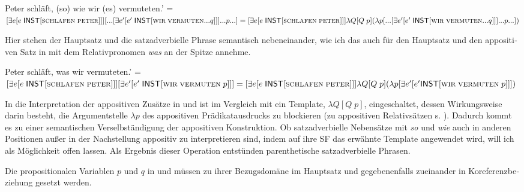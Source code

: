 \documentclass[output=paper, colorlinks, citecolor=brown, booklanguage=german]{langscibook}
\begin{document}
\begin{otherlanguage}{german}
\ea \label{ex:zi97:45} Peter schläft, (so) wie wir (es) vermuteten.' = \\
$[\exists e [e \; \cnst{inst} [\textsc{schlafen} \; \textsc{peter} ]]][...[\exists e' [e' \; \cnst{inst} [\textsc{wir} \; %
\textsc{vermuten} ... q]]] ...p... ] = %
[\exists e [e \; \cnst{inst} [\textsc{schlafen} \; \textsc{peter}]]] \lambda Q [Q\;p] \newline(\lambda p [... [\exists e' [e'\; \cnst{inst} [\textsc{wir} \; \textsc{vermuten} ... q]]] ...p...])$
\z

\noindent Hier stehen der Hauptsatz und die satzadverbielle Phrase semantisch nebeneinander, wie ich das auch für den Hauptsatz und den appositiven Satz in  mit dem Relativpronomen \textit{was} an der Spitze annehme.

\ea \label{ex:zi97:46} Peter schläft, was wir vermuteten.' = \\
$[\exists e [e \; \cnst{inst} [\textsc{schlafen} \; \textsc{peter} ]]][\exists e' [e' \; \cnst{inst} [\textsc{wir} \; %
\textsc{vermuten} \; p]]] = \newline [\exists e [e \; \cnst{inst} [\textsc{schlafen} \; \textsc{peter}]]] \lambda Q [Q\;p] (\lambda p [\exists e' %
[e' \cnst{inst} [\textsc{wir} \; \textsc{vermuten} \; p]]])$
\z

\noindent In die Interpretation der appositiven Zusätze in  und  ist im Vergleich mit  ein Template, $\lambda Q [Q\;p]$, eingeschaltet, dessen Wirkungsweise darin besteht, die Argumentstelle $\lambda p$ des appositiven Prädikatausdrucks zu blockieren (zu appositiven Relativsätzen s. \citealt{zimmermann1992derskopusvonmodifikatoren}). Dadurch kommt es zu einer semantischen Verselbständigung der appositiven Konstruktion. Ob satzadverbielle Nebensätze mit \textit{so} und \textit{wie} auch in anderen Positionen außer in der Nachstellung appositiv zu interpretieren sind, indem auf ihre SF das erwähnte Template angewendet wird, will ich als Möglichkeit offen lassen. Als Ergebnis dieser Operation entstünden parenthetische satzadverbielle Phrasen.

Die propositionalen Variablen $p$ und $q$ in  und  müssen zu ihrer Bezugsdomäne im Hauptsatz und gegebenenfalls zueinander in Koreferenzbeziehung gesetzt werden.


\end{otherlanguage}
\end{document}
